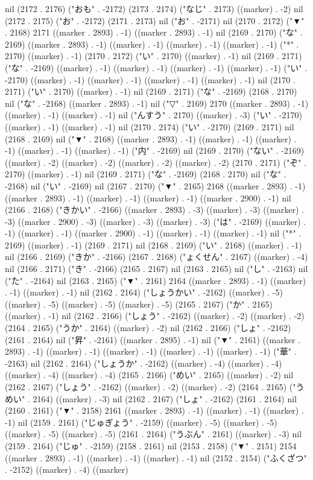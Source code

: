 nil (2172 . 2176) ("おも" . -2172) (2173 . 2174) ("なじ" . 2173) ((marker) . -2) nil (2172 . 2175) ("お" . -2172) (2171 . 2173) nil ("お" . -2171) nil (2170 . 2172) ("▼" . 2168) 2171 ((marker . 2893) . -1) ((marker . 2893) . -1) nil (2169 . 2170) ("な" . 2169) ((marker . 2893) . -1) ((marker) . -1) ((marker) . -1) ((marker) . -1) ("*" . 2170) ((marker) . -1) (2170 . 2172) ("い" . 2170) ((marker) . -1) nil (2169 . 2171) ("な" . -2169) ((marker) . -1) ((marker) . -1) ((marker) . -1) ((marker) . -1) ("い" . -2170) ((marker) . -1) ((marker) . -1) ((marker) . -1) ((marker) . -1) nil (2170 . 2171) ("い" . 2170) ((marker) . -1) nil (2169 . 2171) ("な" . -2169) (2168 . 2170) nil ("な" . -2168) ((marker . 2893) . -1) nil ("▽" . 2169) 2170 ((marker . 2893) . -1) ((marker) . -1) ((marker) . -1) nil ("んすう" . 2170) ((marker) . -3) ("い" . -2170) ((marker) . -1) ((marker) . -1) nil (2170 . 2174) ("い" . -2170) (2169 . 2171) nil (2168 . 2169) nil ("▼" . 2168) ((marker . 2893) . -1) ((marker) . -1) ((marker) . -1) ((marker) . -1) ((marker) . -1) ("内" . -2169) nil (2169 . 2170) ("ない" . -2169) ((marker) . -2) ((marker) . -2) ((marker) . -2) ((marker) . -2) (2170 . 2171) ("ぞ" . 2170) ((marker) . -1) nil (2169 . 2171) ("な" . -2169) (2168 . 2170) nil ("な" . -2168) nil ("い" . -2169) nil (2167 . 2170) ("▼" . 2165) 2168 ((marker . 2893) . -1) ((marker . 2893) . -1) ((marker) . -1) ((marker) . -1) ((marker . 2900) . -1) nil (2166 . 2168) ("きかい" . -2166) ((marker . 2893) . -3) ((marker) . -3) ((marker) . -3) ((marker . 2900) . -3) ((marker) . -3) ((marker) . -3) ("は" . -2169) ((marker) . -1) ((marker) . -1) ((marker . 2900) . -1) ((marker) . -1) ((marker) . -1) nil ("*" . 2169) ((marker) . -1) (2169 . 2171) nil (2168 . 2169) ("い" . 2168) ((marker) . -1) nil (2166 . 2169) ("きか" . -2166) (2167 . 2168) ("ょくせん" . 2167) ((marker) . -4) nil (2166 . 2171) ("き" . -2166) (2165 . 2167) nil (2163 . 2165) nil ("し" . -2163) nil ("た" . -2164) nil (2163 . 2165) ("▼" . 2161) 2164 ((marker . 2893) . -1) ((marker) . -1) ((marker) . -1) nil (2162 . 2164) ("しょうかい" . -2162) ((marker) . -5) ((marker) . -5) ((marker) . -5) ((marker) . -5) (2165 . 2167) ("か" . 2165) ((marker) . -1) nil (2162 . 2166) ("しょう" . -2162) ((marker) . -2) ((marker) . -2) (2164 . 2165) ("うか" . 2164) ((marker) . -2) nil (2162 . 2166) ("しょ" . -2162) (2161 . 2164) nil ("昇" . -2161) ((marker . 2895) . -1) nil ("▼" . 2161) ((marker . 2893) . -1) ((marker) . -1) ((marker) . -1) ((marker) . -1) ((marker) . -1) ("華" . -2163) nil (2162 . 2164) ("しょうか" . -2162) ((marker) . -4) ((marker) . -4) ((marker) . -4) ((marker) . -4) (2165 . 2166) ("めい" . 2165) ((marker) . -2) nil (2162 . 2167) ("しょう" . -2162) ((marker) . -2) ((marker) . -2) (2164 . 2165) ("うめい" . 2164) ((marker) . -3) nil (2162 . 2167) ("しょ" . -2162) (2161 . 2164) nil (2160 . 2161) ("▼" . 2158) 2161 ((marker . 2893) . -1) ((marker) . -1) ((marker) . -1) nil (2159 . 2161) ("じゅぎょう" . -2159) ((marker) . -5) ((marker) . -5) ((marker) . -5) ((marker) . -5) (2161 . 2164) ("うぶん" . 2161) ((marker) . -3) nil (2159 . 2164) ("じゅ" . -2159) (2158 . 2161) nil (2153 . 2158) ("▼" . 2151) 2154 ((marker . 2893) . -1) ((marker) . -1) ((marker) . -1) nil (2152 . 2154) ("ふくざつ" . -2152) ((marker) . -4) ((marker) 